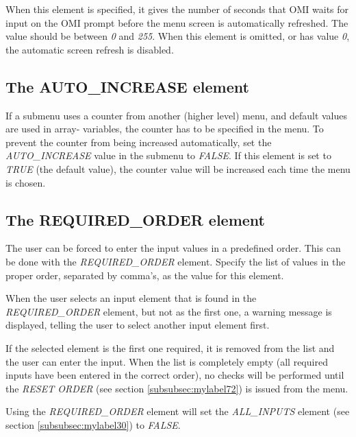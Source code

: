 \documentclass[a4paper]{book}
\newcommand{\vs}{\vspace{3mm}}
\begin{document}
When this element is specified, it gives the number of seconds that OMI 
waits for input on the OMI prompt before the menu screen is automatically 
refreshed. The value should be between \textsl{0} and \textsl{255}. When this element is 
omitted, or has value \textsl{0}, the automatic screen refresh is disabled.

\subsection{The AUTO{\_}INCREASE element}
\label{subsubsec:mylabel28}

If a submenu uses a counter from another (higher level) menu, and default 
values are used in array- variables, the counter has to be specified in the 
menu. To prevent the counter from being increased automatically, set the 
\textsl{AUTO{\_}INCREASE} value in the submenu to \textsl{FALSE}. If this element is set to 
\textsl{TRUE} (the default value), the counter value will be increased each time the 
menu is chosen.

\subsection{The REQUIRED{\_}ORDER element}
\label{subsubsec:mylabel29}

The user can be forced to enter the input values in a predefined order. This 
can be done with the \textsl{REQUIRED{\_}ORDER} element. Specify the list of values 
in the proper order, separated by comma's, as the value for this element.

\vs

When the user selects an input element that is found in the 
\linebreak\textsl{REQUIRED{\_}ORDER} element, but not as the first one, a warning message is 
displayed, telling the user to select another input element first.

\vs

If the selected element is the first one required, it is removed from the 
list and the user can enter the input. When the list is completely empty 
(all required inputs have been entered in the correct order), no checks will 
be performed until the \textsl{RESET ORDER} (see section 
\ref{subsubsec:mylabel72}) is issued from the menu.

\vs

Using the \textsl{REQUIRED{\_}ORDER} element will set the \textsl{ALL{\_}INPUTS} element (see 
section \ref{subsubsec:mylabel30}) to \textsl{FALSE}.
\end{document}
